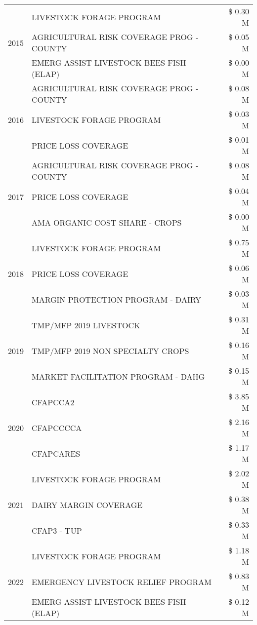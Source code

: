 \begin{tabular}{llr}
\cline{1-3}
\multirow[t]{3}{*}{2015} & LIVESTOCK FORAGE PROGRAM & \$ 0.30 M \\
 & AGRICULTURAL RISK COVERAGE PROG - COUNTY & \$ 0.05 M \\
 & EMERG ASSIST LIVESTOCK BEES FISH (ELAP) & \$ 0.00 M \\
\cline{1-3}
\multirow[t]{3}{*}{2016} & AGRICULTURAL RISK COVERAGE PROG - COUNTY & \$ 0.08 M \\
 & LIVESTOCK FORAGE PROGRAM & \$ 0.03 M \\
 & PRICE LOSS COVERAGE & \$ 0.01 M \\
\cline{1-3}
\multirow[t]{3}{*}{2017} & AGRICULTURAL RISK COVERAGE PROG - COUNTY & \$ 0.08 M \\
 & PRICE LOSS COVERAGE & \$ 0.04 M \\
 & AMA ORGANIC COST SHARE - CROPS & \$ 0.00 M \\
\cline{1-3}
\multirow[t]{3}{*}{2018} & LIVESTOCK FORAGE PROGRAM & \$ 0.75 M \\
 & PRICE LOSS COVERAGE & \$ 0.06 M \\
 & MARGIN PROTECTION PROGRAM - DAIRY & \$ 0.03 M \\
\cline{1-3}
\multirow[t]{3}{*}{2019} & TMP/MFP 2019 LIVESTOCK & \$ 0.31 M \\
 & TMP/MFP 2019 NON SPECIALTY CROPS & \$ 0.16 M \\
 & MARKET FACILITATION PROGRAM - DAHG & \$ 0.15 M \\
\cline{1-3}
\multirow[t]{3}{*}{2020} & CFAPCCA2 & \$ 3.85 M \\
 & CFAPCCCCA & \$ 2.16 M \\
 & CFAPCARES & \$ 1.17 M \\
\cline{1-3}
\multirow[t]{3}{*}{2021} & LIVESTOCK FORAGE PROGRAM & \$ 2.02 M \\
 & DAIRY MARGIN COVERAGE & \$ 0.38 M \\
 & CFAP3 - TUP & \$ 0.33 M \\
\cline{1-3}
\multirow[t]{3}{*}{2022} & LIVESTOCK FORAGE PROGRAM & \$ 1.18 M \\
 & EMERGENCY LIVESTOCK RELIEF PROGRAM & \$ 0.83 M \\
 & EMERG ASSIST LIVESTOCK BEES FISH (ELAP) & \$ 0.12 M \\
\cline{1-3}
\bottomrule
\end{tabular}
